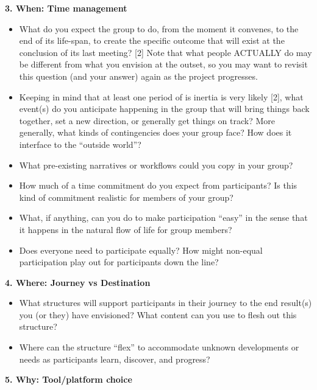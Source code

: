 \textbf{3. When: Time management}

\begin{itemize}
\itemsep1pt\parskip0pt
\item
  What do you expect the group to do, from the moment it convenes, to
  the end of its life-span, to create the specific outcome that will
  exist at the conclusion of its last meeting? {[}2{]} Note that what
  people ACTUALLY do may be different from what you envision at the
  outset, so you may want to revisit this question (and your answer)
  again as the project progresses.
\item
  Keeping in mind that at least one period of is inertia is very likely
  {[}2{]}, what event(s) do you anticipate happening in the group that
  will bring things back together, set a new direction, or generally get
  things on track? More generally, what kinds of contingencies does your
  group face? How does it interface to the ``outside world''?
\item
  What pre-existing narratives or workflows could you copy in your
  group?
\item
  How much of a time commitment do you expect from participants? Is this
  kind of commitment realistic for members of your group?
\item
  What, if anything, can you do to make participation ``easy'' in the
  sense that it happens in the natural flow of life for group members?
\item
  Does everyone need to participate equally? How might non-equal
  participation play out for participants down the line?
\end{itemize}

\textbf{4. Where: Journey vs Destination}

\begin{itemize}
\itemsep1pt\parskip0pt
\item
  What structures will support participants in their journey to the end
  result(s) you (or they) have envisioned? What content can you use to
  flesh out this structure?
\item
  Where can the structure ``flex'' to accommodate unknown developments
  or needs as participants learn, discover, and progress?
\end{itemize}

\textbf{5. Why: Tool/platform choice}

